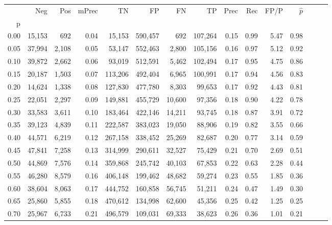 \begin{tabular}{rrrrrrrrrrrrrrr}
\toprule
{} &     Neg &    Pos & mPrec &       TN &       FP &       FN &       TP &  Prec &   Rec &  FP/P & $\hat{p}$ \\
p    &         &        &       &          &          &          &          &       &       &       &           \\
\midrule
0.00 &  15,153 &    692 &  0.04 &   15,153 &  590,457 &      692 &  107,264 &  0.15 &  0.99 &  5.47 &      0.98 \\
0.05 &  37,994 &  2,108 &  0.05 &   53,147 &  552,463 &    2,800 &  105,156 &  0.16 &  0.97 &  5.12 &      0.92 \\
0.10 &  39,872 &  2,662 &  0.06 &   93,019 &  512,591 &    5,462 &  102,494 &  0.17 &  0.95 &  4.75 &      0.86 \\
0.15 &  20,187 &  1,503 &  0.07 &  113,206 &  492,404 &    6,965 &  100,991 &  0.17 &  0.94 &  4.56 &      0.83 \\
0.20 &  14,624 &  1,338 &  0.08 &  127,830 &  477,780 &    8,303 &   99,653 &  0.17 &  0.92 &  4.43 &      0.81 \\
0.25 &  22,051 &  2,297 &  0.09 &  149,881 &  455,729 &   10,600 &   97,356 &  0.18 &  0.90 &  4.22 &      0.78 \\
0.30 &  33,583 &  3,611 &  0.10 &  183,464 &  422,146 &   14,211 &   93,745 &  0.18 &  0.87 &  3.91 &      0.72 \\
0.35 &  39,123 &  4,839 &  0.11 &  222,587 &  383,023 &   19,050 &   88,906 &  0.19 &  0.82 &  3.55 &      0.66 \\
0.40 &  44,571 &  6,219 &  0.12 &  267,158 &  338,452 &   25,269 &   82,687 &  0.20 &  0.77 &  3.14 &      0.59 \\
0.45 &  47,841 &  7,258 &  0.13 &  314,999 &  290,611 &   32,527 &   75,429 &  0.21 &  0.70 &  2.69 &      0.51 \\
0.50 &  44,869 &  7,576 &  0.14 &  359,868 &  245,742 &   40,103 &   67,853 &  0.22 &  0.63 &  2.28 &      0.44 \\
0.55 &  46,280 &  8,579 &  0.16 &  406,148 &  199,462 &   48,682 &   59,274 &  0.23 &  0.55 &  1.85 &      0.36 \\
0.60 &  38,604 &  8,063 &  0.17 &  444,752 &  160,858 &   56,745 &   51,211 &  0.24 &  0.47 &  1.49 &      0.30 \\
0.65 &  25,860 &  5,855 &  0.18 &  470,612 &  134,998 &   62,600 &   45,356 &  0.25 &  0.42 &  1.25 &      0.25 \\
0.70 &  25,967 &  6,733 &  0.21 &  496,579 &  109,031 &   69,333 &   38,623 &  0.26 &  0.36 &  1.01 &      0.21 \\

\end{tabular}
